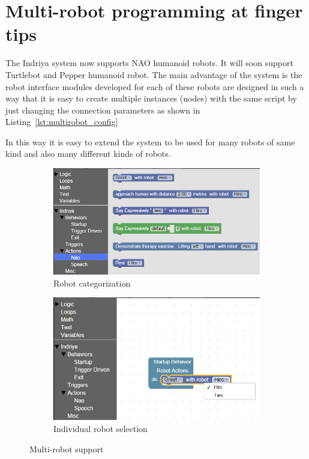 \section{Multi-robot programming at finger tips}
The Indriya system now supports NAO humanoid robots. It will soon support Turtlebot and Pepper humanoid robot. The main advantage of the system is the robot interface modules developed for each of these robots are designed in such a way that it is easy to create multiple instances (nodes) with the same script by just changing the connection parameters as shown in Listing~\ref{lst:multirobot_config}

In this way it is easy to extend the system to be used for many robots of same kind and also many different kinds of robots. 
\begin{figure}
\centering
\begin{subfigure}[t]{0.8\textwidth}
\includegraphics[width=\textwidth]{../thesis/assets/toolbox_multirobot.png}
\caption[Robot categorization]{Robot categorization}
\label{fig:robot_categorize}
\end{subfigure}

\begin{subfigure}[t]{0.8\textwidth}
\includegraphics[width=\textwidth]{../thesis/assets/toolbox_multirobot2.png}
\caption[Individual robot selection]{Individual robot selection}
\label{fig:robot_selection}
\end{subfigure}
\caption[Multi-robot support]{Multi-robot support}
\label{fig:multirobot_support}
\end{figure}
